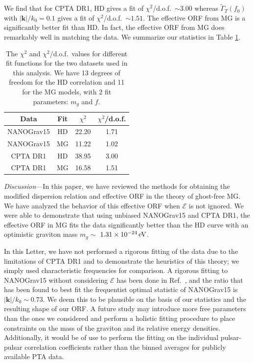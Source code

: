 \documentclass[prd,twocolumn,aps,psfig,nofootinbib,nobibnotes,superscriptaddress,preprintnumbers,times]{revtex4-2}
\newcommand{\eV}{\,{\rm eV}}
\begin{document}
We find that for CPTA DR1, HD gives a fit of $\chi^2$/d.o.f.\ $\sim 3.00$ whereas $\tilde{\Gamma}_T(f_0)$ with $|\boldsymbol{k}|/k_0 = 0.1$ gives a fit of $\chi^2$/d.o.f.\ $\sim 1.51$. The effective ORF from MG  is a significantly better fit than HD. In fact, the effective ORF from MG does remarkably well in matching the data. We summarize our statistics in Table \ref{tbl:chi}.
\begin{table}[ht] 
\centering
\renewcommand{\arraystretch}{1.8}
\begin{tabular}{|c|c|c|c|}
\hline
\textbf{Data} & \textbf{Fit} & \textbf{$\chi^2$} & \textbf{$\chi^2$/d.o.f.} \\
\hline
NANOGrav15 & HD & 22.20 & 1.71 \\
\hline
NANOGrav15 & MG  & 11.22 & 1.02 \\
\hline
CPTA DR1 & HD & 38.95 & 3.00 \\
\hline
CPTA DR1 & MG  & 16.58 & 1.51 \\
\hline
\end{tabular}
\caption{The $\chi^2$ and $\chi^2$/d.o.f.\ values for different fit functions for the two datasets used in this analysis. We have 13 degrees of freedom for the HD correlation and 11 for the MG  models, with 2 fit parameters: $m_g$ and $f$. }
\label{tbl:chi}
\end{table}

\textit{Discussion}---In this paper, we have reviewed the methods for obtaining the modified dispersion relation and effective ORF in the theory of ghost-free MG. We have analyzed the behavior of this effective ORF when $\mathcal{E}$ is not ignored. We were able to demonstrate that using unbiased NANOGrav15 and CPTA DR1, the effective ORF in MG fits the data significantly better than the HD curve with an optimistic graviton mass $m_g \sim$ $1.31\times10^{-24} \eV$.
%

In this Letter, we have not performed a rigorous fitting of the data due to the limitations of CPTA DR1 and to demonstrate the heuristics of this theory; we simply used characteristic frequencies for comparison. A rigorous fitting to NANOGrav15 without considering $\mathcal{E}$ has been done in Ref.~\cite{Arjona:2024cex}, and the ratio that has been found to best fit the frequentist optimal statistic of NANOGrav15 is $|\boldsymbol{k}|/k_0 \sim 0.73$. We deem this to be plausible on the basis of our statistics and the resulting shape of our ORF. A future study may introduce more free parameters than the ones we considered and perform a holistic fitting procedure to place constraints on the mass of the graviton and its relative energy densities. Additionally, it would be of use to perform the fitting on the individual pulsar-pulsar correlation coefficients rather than the binned averages for publicly available PTA data.
\end{document}
